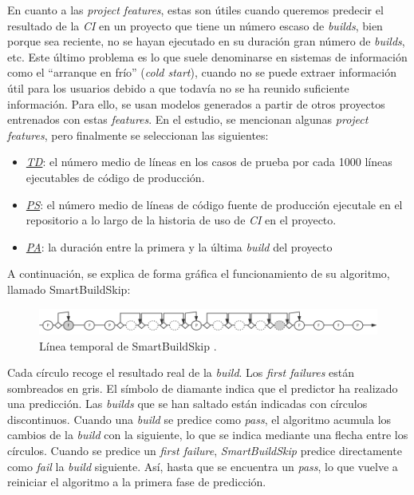 En cuanto a las \textit{project features}, estas son útiles cuando queremos predecir
el resultado de la \textit{CI} en un proyecto que tiene un número escaso de \textit{builds}, bien
porque sea reciente, no se hayan ejecutado en su duración gran número de \textit{builds}, etc. Este
último problema es lo que suele denominarse en sistemas de información como el ``arranque en frío''
(\textit{cold start}), cuando no se puede extraer información útil para los usuarios debido a
que todavía no se ha reunido suficiente información. Para ello, se usan modelos generados a partir
de otros proyectos entrenados con estas \textit{features}. En el estudio, se mencionan algunas
\textit{project features}, pero finalmente se seleccionan las siguientes:

\begin{itemize}
      \item \underline{\textit{TD}}: el número medio de líneas en los casos de prueba por cada
      1000 líneas ejecutables de código de producción.
      \item \underline{\textit{PS}}: el número medio de líneas de código fuente de producción
      ejecutale en el repositorio a lo largo de la historia de uso de \textit{CI} en el proyecto.
      \item \underline{\textit{PA}}: la duración entre la primera y la última \textit{build} del
      proyecto
\end{itemize}


\noindent A continuación, se explica de forma gráfica el funcionamiento de su algoritmo, llamado
SmartBuildSkip:

\begin{figure}[H]
      \centering
      \includegraphics[scale=0.49]{images/SBS.png}
      \caption{Línea temporal de SmartBuildSkip \cite{2}.}
      \label{fig:timeline SBS}
\end{figure}

Cada círculo recoge el resultado real de la \textit{build}. Los \textit{first failures} están
sombreados en gris. El símbolo de diamante indica que el predictor ha realizado una predicción.
Las \textit{builds} que se han saltado están indicadas con círculos discontinuos. Cuando una
\textit{build} se predice como \textit{pass}, el algoritmo acumula los cambios de la
\textit{build} con la siguiente, lo que se indica mediante una flecha entre los círculos. Cuando
se predice un \textit{first failure}, \textit{SmartBuildSkip} predice directamente como
\textit{fail} la \textit{build} siguiente. Así, hasta que se encuentra un \textit{pass}, lo que
vuelve a reiniciar el algoritmo a la primera fase de predicción.\\

